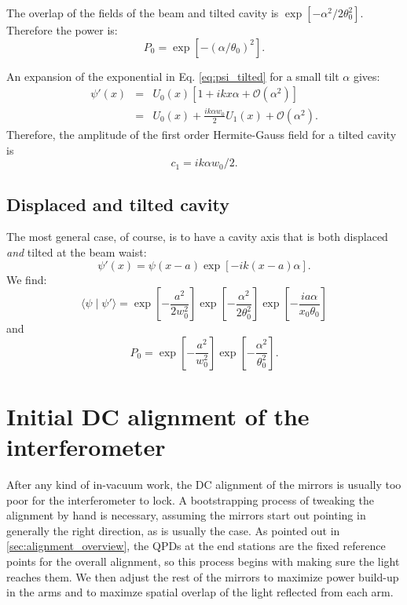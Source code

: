 The overlap of the fields of the beam and tilted cavity is $ \exp{[-\alpha^2/2 \theta_0^2]} $. Therefore the power is:
\begin{equation}
P_0 = \exp{[-(\alpha/\theta_0)^2]}.
\end{equation}

An expansion of the exponential in Eq. \ref{eq:psi_tilted} for a small
tilt $\alpha$ gives:
\begin{eqnarray}
\psi \prime(x) &=& U_0(x) [1 + i k x \alpha + \mathcal{O}(\alpha^2) ] \\
&=& U_0(x) + \frac{i k \alpha w_0}{2} U_1(x) + \mathcal{O}(\alpha^2).
\end{eqnarray}
Therefore, the amplitude of the first order Hermite-Gauss field for a
tilted cavity is 
\begin{equation}
c_1 = i k \alpha w_0 / 2.
\end{equation}


\subsection{Displaced and tilted cavity}
The most general case, of course, is to have a cavity axis that is both displaced \emph{and} tilted at the beam waist:
\begin{equation}
\psi \prime(x) = \psi(x-a) \exp{[-i k (x-a) \alpha]}.
\end{equation}
We find:
\begin{equation}
\langle \psi \mid \psi \prime \rangle = \exp{\left[- \frac{a^2}{2 w_0^2} \right]} \exp{\left[-\frac{\alpha^2}{2 \theta_0^2}\right]} \exp{\left[- \frac{i a \alpha}{x_0 \theta_0}\right]}
\end{equation}
and
\begin{equation}
P_0 = \exp{\left[- \frac{a^2}{w_0^2} \right]}
\exp{\left[-\frac{\alpha^2}{\theta_0^2}\right]}.
\label{eq:pwr_disptilt}
\end{equation}



\section{Initial DC alignment of the interferometer}
\label{sec:initial_alignment}
After any kind of in-vacuum work, the DC alignment of the mirrors is
usually too poor for the interferometer to lock. A bootstrapping
process of tweaking the alignment by hand is necessary, assuming the
mirrors start out pointing in generally the right direction, as is
usually the case. As pointed out in \ref{sec:alignment_overview}, the
QPDs at the end stations are the fixed reference points for the
overall alignment, so this process begins with making sure the light
reaches them. We then adjust the rest of the mirrors to maximize power
build-up in the arms and to maximze spatial overlap of the light
reflected from each arm.

